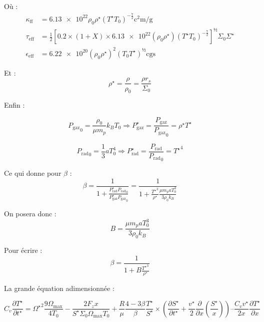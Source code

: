 Où :
\begin{align}
    \kappa_\mathrm{ff} &= \num{6.13e22} \rho_0 \rho^\star \left(T^\star T_0\right)^{-\frac{7}{2}} \si{\square\centi\meter\per\gram} \\
    \tau_\mathrm{eff} &= \frac{1}{2} \left[ \num{0.2} × (1 + X) × \num{6.13e22} \left(\rho_0 \rho^\star\right) \left(T^\star T_0\right)^{-\frac{7}{2}} \right]^½ \Sigma_0 \Sigma^\star \\
    \epsilon_\mathrm{eff} &= \num{6.22e20} (\rho_0 \rho^\star)^2 (T_0 T^\star)^½ \text{cgs}
\end{align}

Et :
\begin{equation}
    \rho^\star = \frac{\rho}{\rho_0} = \frac{\rho r_s}{\Sigma_0}
\end{equation}

Enfin :

\begin{equation}
    {P_\mathrm{gaz}}_0 = \frac{\rho_0}{\mu m_p} k_B T_0 \Rightarrow P_\mathrm{gaz}^\star = \frac{P_\mathrm{gaz}}{{P_\mathrm{gaz}}_0} = \rho^\star T^\star
\end{equation}

\begin{equation}
    {P_\mathrm{rad}}_0 = \frac{1}{3} a T_0^4 \Rightarrow P_\mathrm{rad}^\star = \frac{P_\mathrm{rad}}{{P_\mathrm{rad}}_0} = {T^\star}^4
\end{equation}

Ce qui donne pour $\beta$ :
\begin{equation}
    \beta = \frac{1}{1 + \frac{P_\mathrm{rad}^\star {P_\mathrm{rad}}_0}{P_\mathrm{gaz}^\star {P_\mathrm{gaz}}_0}} = \frac{1}{1 + \frac{{T^\star}^3}{\rho^\star} \frac{\mu m_p a T_0^3}{3 \rho_0 k_B}}
\end{equation}

On posera donc :
\begin{equation}
    B = \frac{\mu m_p a T_0^3}{3 \rho_0 k_B}
\end{equation}

Pour écrire :
\begin{equation}
    \beta = \frac{1}{1 + B \frac{{T^\star}^3}{\rho^\star}}
\end{equation}

La grande équation adimensionnée :

\begin{equation}
    C_v \frac{\partial T^{\star}}{\partial t^{\star}} =
    {\Omega^\star}^2 \frac{9 \Omega_\mathrm{max}}{4 T_0} − \frac{2 F_z x}{S^\star \Sigma_0 \Omega_\mathrm{max} T_0} +
    \frac{R}{\mu} \frac{4−3\beta}{\beta} \frac{T^\star}{S^\star} ×
    \left( \frac{\partial S^\star}{\partial t^\star} + \frac{v^\star}{2} \frac{\partial}{\partial x} \left(\frac{S^\star}{x}\right) \right) –
    \frac{C_v v^\star}{2 x} \frac{\partial T^\star}{\partial x}
\end{equation}

